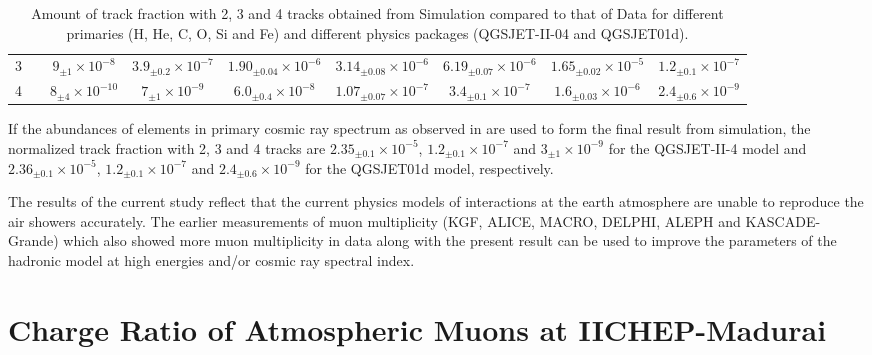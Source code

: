 \documentclass[a4paper,12pt,twoside,openany]{article}
\begin{document}
\begin{table}[]
{\begin{tabular}{cc|cccccc|c|}
\multicolumn{1}{|c|}{3}                                                      &                                                                   & $9_{\pm1}\times 10^{-8}$      & $3.9_{\pm0.2}\times 10^{-7}$ & $1.90_{\pm0.04}\times 10^{-6}$ & $3.14_{\pm0.08}\times 10^{-6}$ & $6.19_{\pm0.07}\times 10^{-6}$ & $1.65_{\pm0.02}\times 10^{-5}$ & $1.2_{\pm0.1}\times 10^{-7}$                                                                                                \\
\multicolumn{1}{|c|}{4}                                                      &                                                                   & $8_{\pm4}\times 10^{-10}$     & $7_{\pm1}\times 10^{-9}$     & $6.0_{\pm0.4}\times 10^{-8}$   & $1.07_{\pm0.07}\times 10^{-7}$ & $3.4_{\pm0.1}\times 10^{-7}$   & $1.6_{\pm0.03}\times 10^{-6}$  & $2.4_{\pm0.6}\times 10^{-9}$                                                                                                \\ \hline
\end{tabular}}
  \caption{Amount of track fraction with 2, 3 and 4 tracks obtained from Simulation compared to that of Data for different primaries (H, He, C, O, Si and Fe) and different physics packages (QGSJET-II-04 and QGSJET01d).}\label{tab:ratio}
\end{table}

If the abundances of elements in primary cosmic ray spectrum as observed in \cite{cosmic1} are used to form the final result from simulation, the normalized track fraction with 2, 3 and 4 tracks are $2.35_{\pm0.1}\times 10^{-5}$, $1.2_{\pm0.1}\times 10^{-7}$ and $3_{\pm1}\times 10^{-9}$ for the QGSJET-II-4 model and $2.36_{\pm0.1}\times 10^{-5}$, $1.2_{\pm0.1}\times 10^{-7}$ and $2.4_{\pm0.6}\times 10^{-9}$ for the QGSJET01d model, respectively.

The results of the current study reflect that the current physics models of interactions at the earth atmosphere are unable to reproduce the air showers accurately. The earlier measurements of muon multiplicity (KGF\cite{kgf1}, ALICE\cite{alice1}, MACRO\cite{macro1}, DELPHI\cite{delphi1}, ALEPH\cite{aleph1} and KASCADE-Grande\cite{kascade1}) which also showed more muon multiplicity in data along with the present result can be used to improve the parameters of the hadronic model at high energies and/or cosmic ray spectral index.

\section{Charge Ratio of Atmospheric Muons at IICHEP-Madurai}
\end{document}
